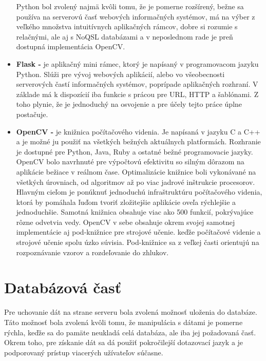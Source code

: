 \begin{itemize}
    Python bol zvolený najmä kvôli tomu, že je pomerne rozšírený, bežne sa používa na serverovú časť webových informačných systémov, má na výber z veľkého množstva intuitívnych aplikačných rámcov, dobre si rozumie s relačnými, ale aj s NoQSL databázami a v neposlednom rade je preň dostupná implementácia OpenCV.
    \item \textbf{Flask -} je aplikačný mini rámec, ktorý je napísaný v programovacom jazyku Python. Slúži pre vývoj webových aplikácií, alebo vo všeobecnosti serverových častí informačných systémov, poprípade aplikačných rozhraní. V základe má k dispozícií iba funkcie s prácou pre URL, HTTP a šablónami. Z toho plynie, že je jednoduchý na osvojenie a pre účely tejto práce úplne postačuje. \cite{YNlrXY2RKWca3gk8}
    \item \textbf{OpenCV -} je knižnica počítačového videnia. Je napísaná v jazyku C a C++ a je možné ju použiť na všetkých bežných aktuálnych platformách. Rozhranie je dostupné pre Python, Java, Ruby a ostatné bežné programovacie jazyky. OpenCV bolo navrhnuté pre výpočtovú efektivitu so silným dôrazom na aplikácie bežiace v reálnom čase. Optimalizácie knižnice boli vykonávané na všetkých úrovniach, od algoritmov až po viac jadrové inštrukcie procesorov. Hlavným cieľom je ponúknuť jednoduchú infraštruktúru počítačového videnia, ktorá by pomáhala ľuďom tvoriť zložitejšie aplikácie oveľa rýchlejšie a jednoduchšie. Samotná knižnica obsahuje viac ako 500 funkcií, pokrývajúce rôzne odvetvia vedy. OpenCV v sebe obsahuje okrem svojej samotnej implementácie aj pod-knižnice pre strojové učenie. keďže počítačové videnie a strojové učenie spolu úzko súvisia. Pod-knižnice sa z veľkej časti orientujú na rozpoznávanie vzorov a rozdeľovanie do zhlukov. \cite{Bradskic2008}
\end{itemize}

\section{Databázová časť}
Pre uchovanie dát na strane serveru bola zvolená možnosť uloženia do databáze. Táto možnosť bola zvolená kvôli tomu, že manipulácia s dátami je pomerne rýchla, keďže sa do pamäte neukladá celá databáza, ale iba jej požadovaná časť. Okrem toho, pre získanie dát sa dá použiť pokročilejší dotazovací jazyk a je podporovaný prístup viacerých užívateľov súčasne. 

